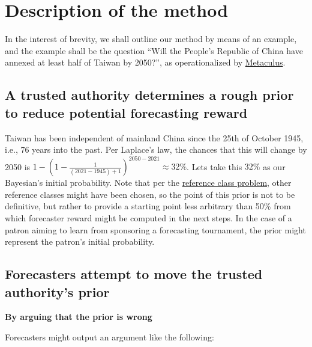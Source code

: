 \documentclass[]{article}
\begin{document}
\hypertarget{description-of-the-method}{%
\section{Description of the method}\label{description-of-the-method}}

In the interest of brevity, we shall outline our method by means of an
example, and the example shall be the question ``Will the People's
Republic of China have annexed at least half of Taiwan by 2050?'', as
operationalized by
\href{https://www.metaculus.com/questions/5320/chinese-annexation-of-most-of-taiwan-by-2050/}{Metaculus}.

\hypertarget{a-trusted-authority-determines-a-rough-prior-to-reduce-potential-forecasting-reward}{%
\subsection{A trusted authority determines a rough prior to reduce
potential forecasting
reward}\label{a-trusted-authority-determines-a-rough-prior-to-reduce-potential-forecasting-reward}}

Taiwan has been independent of mainland China since the 25th of October
1945, i.e., 76 years into the past. Per Laplace's law, the chances that
this will change by 2050 is
\(1-(1-\frac{1}{(2021-1945)+1})^{2050-2021} \approx 32\%\). Lets take
this \(32\%\) as our Bayesian's initial probability. Note that per the
\href{https://en.wikipedia.org/wiki/Reference_class_problem}{reference
class problem}, other reference classes might have been chosen, so the
point of this prior is not to be definitive, but rather to provide a
starting point less arbitrary than 50\% from which forecaster reward
might be computed in the next steps. In the case of a patron aiming to
learn from sponsoring a forecasting tournament, the prior might
represent the patron's initial probability.

\hypertarget{forecasters-attempt-to-move-the-trusted-authoritys-prior}{%
\subsection{Forecasters attempt to move the trusted authority's
prior}\label{forecasters-attempt-to-move-the-trusted-authoritys-prior}}

\textbf{By arguing that the prior is wrong}

Forecasters might output an argument like the following:
\end{document}
